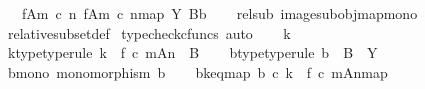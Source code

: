 \begin{isabellebody}
\ \ \ {\isachardoublequoteopen}{\isacharparenleft}{\kern0pt}f{\isasymlparr}A{\isasymrparr}\isactrlbsub m\ {\isasymcirc}\isactrlsub c\ n\isactrlesub {\isacharcomma}{\kern0pt}\ {\isacharbrackleft}{\kern0pt}f{\isasymlparr}A{\isasymrparr}\isactrlbsub m\ {\isasymcirc}\isactrlsub c\ n\isactrlesub {\isacharbrackright}{\kern0pt}map{\isacharparenright}{\kern0pt}\ {\isasymsubseteq}\isactrlbsub Y\isactrlesub \ {\isacharparenleft}{\kern0pt}B{\isacharcomma}{\kern0pt}b{\isacharparenright}{\kern0pt}{\isachardoublequoteclose}\isanewline
%
\isadelimproof
\ \ %
\endisadelimproof
%
\isatagproof
{}\isamarkupfalse%
\ rel{\isacharunderscore}{\kern0pt}sub{}\ image{\isacharunderscore}{\kern0pt}subobj{\isacharunderscore}{\kern0pt}map{\isacharunderscore}{\kern0pt}mono\isanewline
\ \ \isamarkupfalse%
\ relative{\isacharunderscore}{\kern0pt}subset{\isacharunderscore}{\kern0pt}def{}\isanewline
{}\isamarkupfalse%
\ {\isacharparenleft}{\kern0pt}typecheck{\isacharunderscore}{\kern0pt}cfuncs{\isacharcomma}{\kern0pt}\ auto{\isacharparenright}{\kern0pt}\isanewline
\ \ \isamarkupfalse%
\ k\isanewline
\ \ \isamarkupfalse%
\ k{\isacharunderscore}{\kern0pt}type{\isacharbrackleft}{\kern0pt}type{\isacharunderscore}{\kern0pt}rule{\isacharbrackright}{\kern0pt}{\isacharcolon}{\kern0pt}\ {\isachardoublequoteopen}k\ {\isacharcolon}{\kern0pt}\ {\isacharparenleft}{\kern0pt}f\ {\isasymcirc}\isactrlsub c\ m{\isacharparenright}{\kern0pt}{\isasymlparr}A{\isasymrparr}\isactrlbsub n\isactrlesub \ {\isasymrightarrow}\ B{\isachardoublequoteclose}\isanewline
\ \ \isamarkupfalse%
\ b{\isacharunderscore}{\kern0pt}type{\isacharbrackleft}{\kern0pt}type{\isacharunderscore}{\kern0pt}rule{\isacharbrackright}{\kern0pt}{\isacharcolon}{\kern0pt}\ {\isachardoublequoteopen}b\ {\isacharcolon}{\kern0pt}\ B\ {\isasymrightarrow}\ Y{\isachardoublequoteclose}\isanewline
\ \ \isamarkupfalse%
\ b{\isacharunderscore}{\kern0pt}mono{\isacharcolon}{\kern0pt}\ {\isachardoublequoteopen}monomorphism\ b{\isachardoublequoteclose}\isanewline
\ \ \isamarkupfalse%
\ b{\isacharunderscore}{\kern0pt}k{\isacharunderscore}{\kern0pt}eq{\isacharunderscore}{\kern0pt}map{\isacharcolon}{\kern0pt}\ {\isachardoublequoteopen}b\ {\isasymcirc}\isactrlsub c\ k\ {\isacharequal}{\kern0pt}\ {\isacharbrackleft}{\kern0pt}{\isacharparenleft}{\kern0pt}f\ {\isasymcirc}\isactrlsub c\ m{\isacharparenright}{\kern0pt}{\isasymlparr}A{\isasymrparr}\isactrlbsub n\isactrlesub {\isacharbrackright}{\kern0pt}map{\isachardoublequoteclose}\isanewline

\end{isabellebody}

